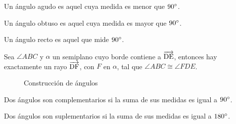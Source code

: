 \begin{definition}
    Un ángulo agudo es aquel cuya medida es menor que $90^{\circ}$.
\end{definition}

\begin{definition}
    Un ángulo obtuso es aquel cuya medida es mayor que $90^{\circ}$.
\end{definition}

\begin{definition}
    Un ángulo recto es aquel que mide $90^{\circ}$.
\end{definition}

\clearpage

\begin{theorem}
    Sea $\angle{ABC}$ y $\alpha$ un semiplano cuyo borde contiene a $\overrightarrow{\rm DE}$, entonces hay exactamente un rayo $\overrightarrow{\rm DF}$, con $F$ en $\alpha$, tal que $\angle{ABC} \cong \angle{FDE}$.

    \begin{figure}[h!]
    
        \centering
    
        \begin{subfigure}[b]{.3\textwidth}
            \centering
            
            \label{fig:plot108}
        \end{subfigure}%
        \begin{subfigure}[b]{.3\textwidth}
            \centering
            
            \label{fig:plot109}
        \end{subfigure}

        \caption{Construcción de ángulos}
        \label{fig:ang-const-teorema}
        
    \end{figure}        
    
\end{theorem}

\begin{definition}
    Dos ángulos son complementarios si la suma de sus medidas es igual a $90^{\circ}$.
\end{definition}

\begin{definition}
    Dos ángulos son suplementarios si la suma de sus medidas es igual a $180^{\circ}$.
\end{definition}

